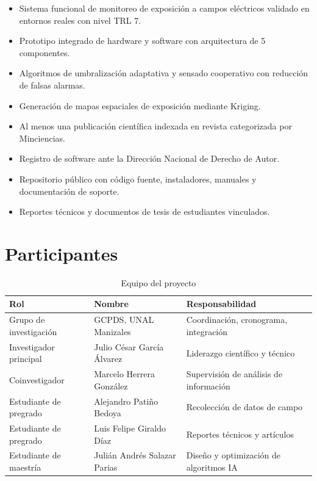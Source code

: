 \documentclass[12pt,a4paper]{article}
\begin{document}
\begin{itemize}
  \item Sistema funcional de monitoreo de exposición a campos eléctricos validado en entornos reales con nivel TRL 7.
  \item Prototipo integrado de hardware y software con arquitectura de 5 componentes.
  \item Algoritmos de umbralización adaptativa y sensado cooperativo con reducción de falsas alarmas.
  \item Generación de mapas espaciales de exposición mediante Kriging.
  \item Al menos una publicación científica indexada en revista categorizada por Minciencias.
  \item Registro de software ante la Dirección Nacional de Derecho de Autor.
  \item Repositorio público con código fuente, instaladores, manuales y documentación de soporte.
  \item Reportes técnicos y documentos de tesis de estudiantes vinculados.
\end{itemize}

\section{Participantes}

\begin{table}[H]
\centering
\caption{Equipo del proyecto}
\begin{tabular}{@{}lll@{}}
\toprule
\textbf{Rol} & \textbf{Nombre} & \textbf{Responsabilidad} \\
\midrule
Grupo de investigación & GCPDS, UNAL Manizales & Coordinación, cronograma, integración \\
Investigador principal & Julio César García Álvarez & Liderazgo científico y técnico \\
Coinvestigador & Marcelo Herrera González & Supervisión de análisis de información \\
Estudiante de pregrado & Alejandro Patiño Bedoya & Recolección de datos de campo \\
Estudiante de pregrado & Luis Felipe Giraldo Díaz & Reportes técnicos y artículos \\
Estudiante de maestría & Julián Andrés Salazar Parias & Diseño y optimización de algoritmos IA \\
\bottomrule
\end{tabular}
\end{table}
\end{document}
